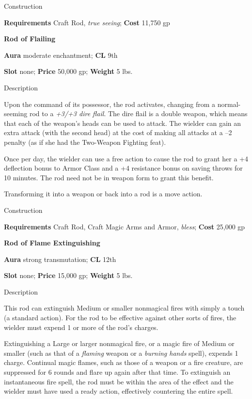 Construction
				
\textbf{Requirements} Craft Rod, \textit{true seeing}; \textbf{Cost }11,750 gp
				
\textbf{Rod of Flailing}
				
\textbf{Aura} moderate enchantment;\textbf{ CL }9th
				
\textbf{Slot} none; \textbf{Price} 50,000 gp; \textbf{Weight} 5 lbs.
				
Description
				
Upon the command of its possessor, the rod activates, changing from a normal-seeming rod to a \textit{+3/+3 dire flail}. The dire flail is a double weapon, which means that each of the weapon's heads 
can be used
 to attack. The wielder can gain an extra attack (with the second head) at the cost of making all attacks at a --2 penalty (as if she had the Two-Weapon Fighting feat).
				
Once per day, the wielder can use a free action to cause the rod to grant her a +4 deflection bonus to Armor Class and a +4 resistance bonus on saving throws for 10 minutes. The rod need not be in weapon form to grant this benefit.
				
Transforming it into a weapon or back into a rod is a move action. 
				
Construction
				
\textbf{Requirements} Craft Rod, Craft Magic Arms and Armor, \textit{bless}; \textbf{Cost }25,000 gp
				
\textbf{Rod of Flame Extinguishing}
				
\textbf{Aura} strong transmutation;\textbf{ CL }12th
				
\textbf{Slot} none; \textbf{Price} 15,000 gp; \textbf{Weight} 5 lbs.
				
Description
				
This rod can extinguish Medium or smaller nonmagical fires with simply a touch (a standard action). For the rod to be effective against other sorts of fires, the wielder must expend 1 or more of the rod's charges.
				
Extinguishing a Large or larger nonmagical fire, or a magic fire of Medium or smaller (such as that of a \textit{flaming} weapon or a \textit{burning hands} spell), expends 1 charge. Continual magic flames, such as those of a weapon or a fire creature, are suppressed for 6 rounds and flare up again after that time. To extinguish an instantaneous fire spell, the rod must be within the area of the effect and the wielder must have used a ready action, effectively countering the entire spell.
				
